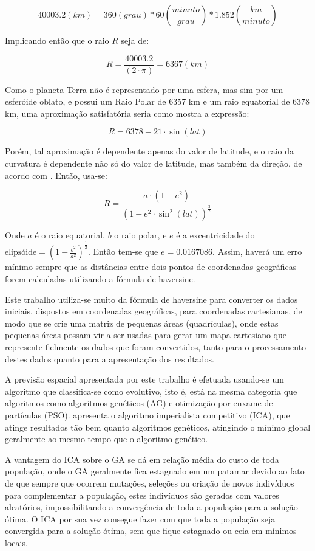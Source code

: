 \[40003.2 (km) = 360(grau) * 60\left(\frac{minuto}{grau}\right) * 1.852\left(\frac{km}{minuto}\right)  \]

Implicando então que o raio \(R\) seja de:

\[R = \frac{40003.2}{(2 \cdot \pi)} = 6367 (km) \]

Como o planeta Terra não é representado por uma esfera, mas sim por um esferóide oblato, e possui um Raio Polar de 6357 km e um raio equatorial de 6378 km, uma aproximação satisfatória seria como mostra a expressão:

\[R = 6378 - 21 \cdot \sin(lat) \]

Porém, tal aproximação é dependente apenas do valor de latitude, e o raio da curvatura é dependente não só do valor de latitude, mas também da direção, de acordo com \cite{snyder1987map}. Então, usa-se:

\[R = \frac{ a \cdot (1 - e^2)}{ (1 - e^2 \cdot \sin^2(lat))^\frac{3}{2}}\]

Onde \(a\) é o raio equatorial, \(b\) o raio polar, e \(e\) é a excentricidade do 
\(\text{elipsóide} = \left(1 - \frac{b^2}{a^2}\right)^\frac{1}{2}\). 
Então tem-se que \(e = 0.0167086\). Assim, haverá um erro mínimo sempre que as distâncias entre dois pontos de coordenadas geográficas forem calculadas utilizando a fórmula de haversine.

Este trabalho utiliza-se muito da fórmula de haversine para converter os dados iniciais, dispostos em coordenadas geográficas, para coordenadas cartesianas, de modo que se crie uma matriz de pequenas áreas (quadrículas), onde estas pequenas áreas possam vir a ser usadas para gerar um mapa cartesiano que represente fielmente os dados que foram convertidos, tanto para o processamento destes dados quanto para a apresentação dos resultados.

A previsão espacial apresentada por este trabalho é efetuada usando-se um algoritmo que classifica-se como evolutivo, isto é, está na mesma categoria que algoritmos como algoritmos genéticos (AG) \cite{mitchell1998introduction} e otimização por enxame de partículas (PSO). \cite{atashpaz2007imperialist} apresenta o algoritmo imperialista competitivo (ICA), que atinge resultados tão bem quanto algoritmos genéticos, atingindo o mínimo global geralmente ao mesmo tempo que o algoritmo genético. 

A vantagem do ICA sobre o GA se dá em relação média do custo de toda população, onde o GA geralmente fica estagnado em um patamar devido ao fato de que sempre que ocorrem mutações, seleções ou criação de novos indivíduos para complementar a população, estes indivíduos são gerados com valores aleatórios, impossibilitando a convergência de toda a população para a solução ótima. O ICA por sua vez consegue fazer com que toda a população seja convergida para a solução ótima, sem que fique estagnado ou ceia em mínimos locais.  

